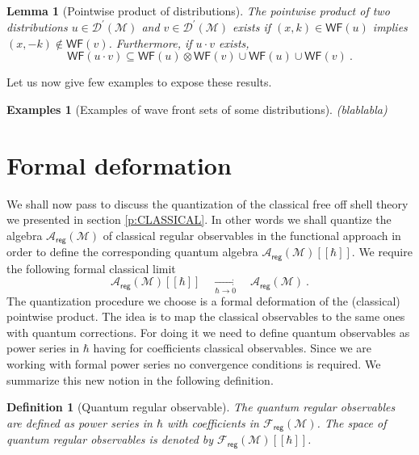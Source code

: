 \documentclass[11pt]{book}
\newcommand{\hilight}[1]{\colorbox{yellow!80!black}{#1}}
\newcommand{\WF}{\mathsf{WF}}
\newcommand{\reg}{\mathsf{reg}}
\newcommand{\Acal}{\mathcal{A}}
\newcommand{\Dcal}{\mathcal{D}}
\newcommand{\Fcal}{\mathcal{F}}
\newcommand{\Mcal}{\mathcal{M}}
\theoremstyle{break}
\newtheorem{lemma}{Lemma}[chapter]
\newtheorem{examples}{Examples}[chapter]
\newtheorem{definition}{Definition}[chapter]
\begin{document}
\begin{lemma}[Pointwise product of distributions]\label{lem:prod_distrib_wf}
The pointwise product of two distributions $u\in\Dcal^\prime(\Mcal)$ and $v\in\Dcal^\prime(\Mcal)$ exists if $(x,k) \in \WF(u)$ implies $(x,-k) \notin \WF(v)$. Furthermore, if $u\cdot v$ exists, 
\begin{equation*}
\WF(u \cdot v) \subseteq \WF(u) \otimes \WF(v) \cup \WF(u) \cup \WF(v) \ . 
\end{equation*} 
%
\end{lemma}


Let us now give few examples to expose these results. 


\begin{examples}[Examples of wave front sets of some distributions]
\hilight{(blablabla)}
\end{examples}


\section{Formal deformation}
\label{p:Q_DEFORM}


We shall now pass to discuss the quantization of the classical free off shell theory we presented in section \ref{p:CLASSICAL}. In other words we shall quantize the algebra $\Acal_\reg(\Mcal)$ of classical regular observables in the functional approach in order to define the corresponding quantum algebra $\Acal_\reg(\Mcal)[[\hbar]]$. We require the following formal classical limit
%
\begin{equation*}
\Acal_\reg(\Mcal)[[\hbar]] \quad \underset{\hbar \to 0}{\longrightarrow} \quad \Acal_\reg(\Mcal) \ . 
\end{equation*}
%
The quantization procedure we choose is a formal deformation of the (classical) pointwise product. The idea is to map the classical observables to the same ones with quantum corrections. For doing it we need to define quantum observables as power series in $\hbar$ having for coefficients classical observables. Since we are working with formal power series no convergence conditions is required. We summarize this new notion in the following definition.


\begin{definition}[Quantum regular observable]\label{def:obs_reg_q}
The quantum regular observables are defined as power series in $\hbar$ with coefficients in $\Fcal_\reg(\Mcal)$. The space of quantum regular observables is denoted by $\Fcal_\reg(\Mcal)[[\hbar]]$.
\end{definition}
\end{document}
